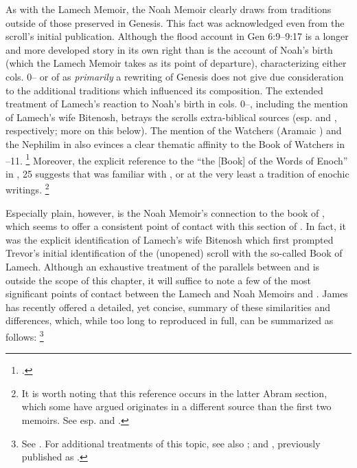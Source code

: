 As with the Lamech Memoir, the Noah Memoir clearly draws from traditions outside of those preserved in Genesis. This fact was acknowledged even from the scroll's initial publication.%
    \autocite[38]{avigad-yadin1956}
Although the flood account in Gen 6:9--9:17 is a longer and more developed story in its own right than is the account of Noah's birth (which the Lamech Memoir takes as its point of departure), characterizing either cols. 0-- or  of \ga as \emph{primarily} a rewriting of Genesis does not give due consideration to the additional traditions which influenced its composition. The extended treatment of Lamech's reaction to Noah's birth in cols. 0--, including the mention of Lamech's wife Bitenosh, betrays the scrolls extra-biblical sources (esp. \firstenoch and \jub, respectively; more on this below). The mention of the Watchers (Aramaic ) and the Nephilim in  also evinces a clear thematic affinity to the Book of Watchers in --11.%
    \footnote{\Cite[174]{nickelsburg2005}.}
Moreover, the explicit reference to the ``the [Book] of the Words of Enoch'' in , 25 suggests that \ga was familiar with \firstenoch, or at the very least a tradition of enochic writings.%
    \footnote{It is worth noting that this reference occurs in the latter Abram section, which some have argued originates in a different source than the first two memoirs. See esp. \cite{bernstein_berthelot-etal2010} and \cite{bernstein_as2010}.}

Especially plain, however, is the Noah Memoir's connection to the book of \jub, which seems to offer a consistent point of contact with this section of \ga.%
    \autocite[20]{fitzmyer2004}
In fact, it was the explicit identification of Lamech's wife Bitenosh which first prompted Trevor's initial identification of the (unopened) scroll with the so-called Book of Lamech.%
    \autocite{trevor_basor1949}
Although an exhaustive treatment of the parallels between \jub and \ga is outside the scope of this chapter, it will suffice to note a few of the most significant points of contact between the Lamech and Noah Memoirs and \jub. James \vanderkam has recently offered a detailed, yet concise, summary of these similarities and differences, which, while too long to reproduced in full, can be summarized as follows:%
    \footnote{See \cite[374--376]{vanderkam_feldman-etal2017}. For additional treatments of this topic, see also 
    \cite{machiela2009}; \cite{machiela_mason-etal2012} and 
    \cite[305--342]{kugel2012}, previously published as 
    \cite{kugel_roitman-etal2011}.} 

